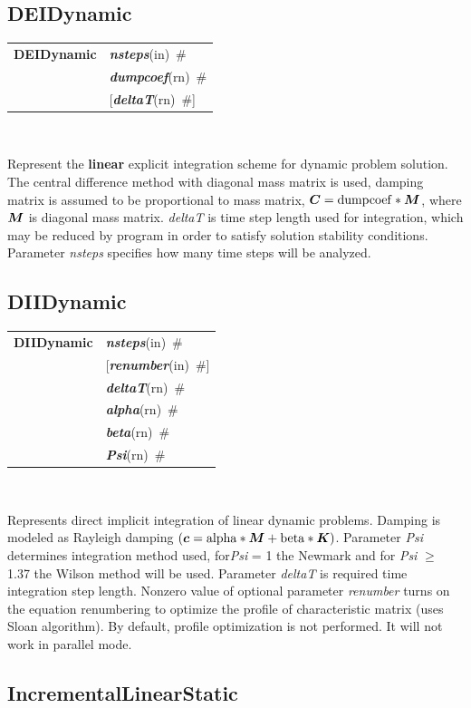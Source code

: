 \documentclass[a4paper]{article}
\makeatletter
\newcommand{\mbf}[1]{\mbox{\boldmath$#1$}}
\newcommand{\param}[1]{{\em #1}}
\newcommand{\keywordnotype}[1]{\mbox{{\it{\bf{#1}}}}}
\newcommand{\keyword}[2]{\mbox{{\keywordnotype{#1}\tiny (#2)}}}
\newcommand{\entKeywordInst}[1]{\mbox{{\bf{{#1}}}}}
\newcommand{\field}[2]{\mbox{\keyword{#1}{#2}~\#}}
\newcommand{\optField}[2]{\mbox{[\field{#1}{#2}]}}
\newenvironment{record}[1][]{\begin{tabular}{|ll}}{\end{tabular}\\}
\newcommand{\recentry}[2]{{#1}&{#2}\\}
\newcounter{rcc}
\newenvironment{record}[1][\textwidth]{\setcounter{rcc}{0}\begin{tabular*}{#1}{|ll@{\extracolsep{\fill}}r}}{\end{tabular*}\\}
\newcommand{\recentry}[2]{\ifthenelse{\value{rcc}>0}{&$\backslash$ \\}{\setcounter{rcc}{1}}{#1}&{#2}}
\makeatother
\begin{document}
\subsection{DEIDynamic}
\label{DEIDynamic}

\begin{record}
\recentry{\entKeywordInst{DEIDynamic}}{\field{nsteps}{in}}
\recentry{}{\field{dumpcoef}{rn}} \recentry{}{\optField{deltaT}{rn}}
\end{record}

Represent the {\bf linear} explicit
integration scheme for dynamic problem solution. The central difference method with diagonal mass matrix is used,
damping matrix is assumed to be proportional to mass matrix, $\mbf{C} = {\rm dumpcoef} * \mbf{M}$, where
$\mbf{M}$ is diagonal mass matrix. \param{deltaT} is time step length used for
integration, which may be reduced by program in order to satisfy
solution stability conditions. Parameter \param{nsteps} specifies
how many time steps will be analyzed.

\subsection{DIIDynamic}
\label{DIIDynamic}

\begin{record}
\recentry{\entKeywordInst{DIIDynamic}}{\field{nsteps}{in}}
\recentry{}{\optField{renumber}{in}}
\recentry{}{\field{deltaT}{rn}} \recentry{}{\field{alpha}{rn}} \recentry{}{\field{beta}{rn}}
\recentry{}{\field{Psi}{rn}}
\end{record}

Represents direct implicit integration of linear dynamic
problems. Damping is modeled as Rayleigh damping $(\mbf{c} =
\rm{alpha}*\mbf{M} + \rm{beta} * \mbf{K})$. Parameter \param{Psi} determines
integration method used, for\param{Psi} = 1 the Newmark and for \param{Psi} $\ge$ 1.37 the Wilson method
will be used. Parameter \param{deltaT} is required time integration
step length.
Nonzero value of optional parameter \param{renumber} turns on the
equation renumbering to optimize the profile of characteristic matrix
(uses Sloan algorithm). By default, profile optimization is not
performed. It will not work in parallel mode.

\subsection{IncrementalLinearStatic}
\label{IncrementalLinearStatic}
\end{document}
